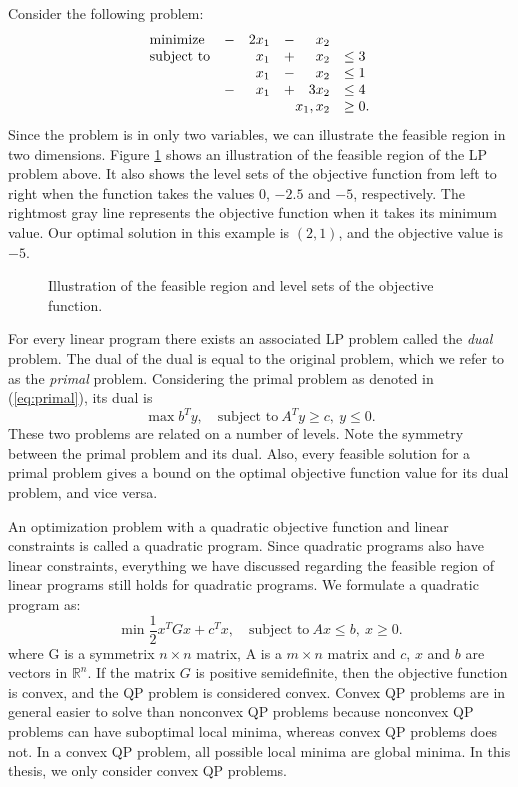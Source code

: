 Consider the following problem:
\[
\begin{array}{lcrcrl}
    \textrm{minimize}   &-& 2 x_1 &-&   x_2 \\
    \textrm{subject to} & &   x_1 &+&   x_2 & \leq 3 \\
                        & &   x_1 &-&   x_2 & \leq 1 \\
                        &-&   x_1 &+& 3 x_2 & \leq 4 \\
     \multicolumn{5}{r}{x_1,x_2}            & \geq 0.
\end{array}
\]
Since the problem is in only two variables, we can illustrate the feasible
region in two dimensions.
Figure \ref{fig:lpback} shows an illustration of the feasible
region of the LP problem above. It also shows the level sets of the objective
function from left to right when the function takes the values $0$, $-2.5$ and
$-5$, respectively.
The rightmost gray line represents the objective function when it takes
its minimum value. Our optimal solution in this example is $(2,1)$, and the
objective value is $-5$.

\begin{figure}[ht!]
\centering

\caption{Illustration of the feasible region and level sets of the objective
         function.}
\label{fig:lpback}
\end{figure}

For every linear program there exists an associated LP problem called
the \textit{dual} problem.
The dual of the dual is equal to the original problem, which we refer to as
the \textit{primal} problem.
Considering the primal problem as denoted in (\ref{eq:primal}), its dual is
\[
\max{b^T y},\quad \textrm{subject to}~A^T y \geq c, ~ y \leq 0.
\]
These two problems are related on a number of levels.
Note the symmetry between the primal problem and its dual.
Also, every feasible solution for a primal problem gives a bound on the optimal
objective function value for its dual problem, and vice
versa\cite{vanderbei,nocedal,boyd}.

An optimization problem with a quadratic objective function and linear
constraints is called a quadratic program. Since quadratic programs also have
linear constraints, everything we have discussed regarding the feasible region
of linear programs still holds for quadratic programs. We formulate a quadratic
program as:
\[
\min{\frac{1}{2}x^T G x + c^T x},\quad \textrm{subject to}~Ax \leq b, ~ x \geq 0.
\]
where G is a symmetrix $n \times n$ matrix, A is a $m \times n$ matrix
and $c$, $x$ and $b$ are vectors in $\mathbb{R}^n$. If the matrix $G$ is
positive semidefinite, then the objective function is convex, and the
QP problem is considered convex.
Convex QP problems are in general easier to solve than
nonconvex QP problems because nonconvex QP problems can have suboptimal
local minima, whereas convex QP problems does not.
In a convex QP problem, all possible local minima are global
minima. In this thesis, we only consider convex QP problems.

